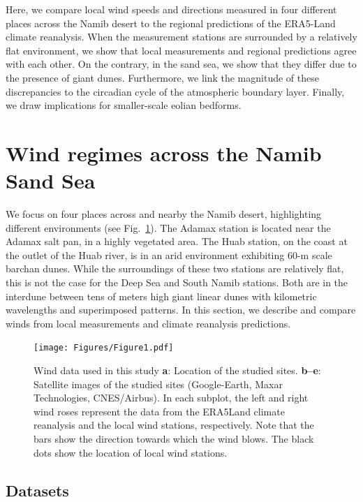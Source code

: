 Here, we compare local wind speeds and directions measured in four different places across the Namib desert to the regional predictions of the ERA5-Land climate reanalysis. When the measurement stations are surrounded by a relatively flat environment, we show that local measurements and regional predictions agree with each other. On the contrary, in the sand sea, we show that they differ due to the presence of giant dunes. Furthermore, we link the magnitude of these discrepancies to the circadian cycle of the atmospheric boundary layer. Finally, we draw implications for smaller-scale eolian bedforms.


\section{Wind regimes across the Namib Sand Sea}

  We focus on four places across and nearby the Namib desert, highlighting different environments (see Fig.~\ref{Fig1}).
  The Adamax station is located near the Adamax salt pan, in a highly vegetated area. The Huab station, on the coast at the outlet of the Huab river, is in an arid environment exhibiting $60$-m scale barchan dunes. While the surroundings of these two stations are relatively flat, this is not the case for the Deep Sea and South Namib stations. Both are in the interdune between tens of meters high giant linear dunes with kilometric wavelengths and superimposed patterns. In this section, we describe and compare winds from local measurements and climate reanalysis predictions.

  \begin{figure}
    \centering
    \texttt{[image: Figures/Figure1.pdf]}
    \caption{Wind data used in this study \textbf{a}: Location of the studied sites. \textbf{b--e}: Satellite images of the studied sites (Google-Earth, Maxar Technologies, CNES/Airbus). In each subplot, the left and right wind roses represent the data from the ERA5Land climate reanalysis and the local wind stations, respectively. Note that the bars show the direction towards which the wind blows. The black dots show the location of local wind stations.}
    \label{Fig1}
  \end{figure}

  \subsection{Datasets}

